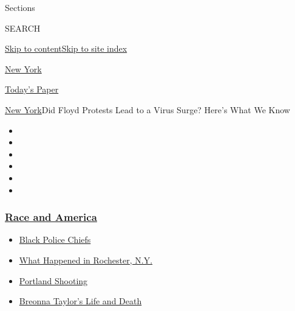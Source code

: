 Sections

SEARCH

\protect\hyperlink{site-content}{Skip to
content}\protect\hyperlink{site-index}{Skip to site index}

\href{https://www.nytimes3xbfgragh.onion/section/nyregion}{New York}

\href{https://myaccount.nytimes3xbfgragh.onion/auth/login?response_type=cookie\&client_id=vi}{}

\href{https://www.nytimes3xbfgragh.onion/section/todayspaper}{Today's
Paper}

\href{/section/nyregion}{New York}\textbar{}Did Floyd Protests Lead to a
Virus Surge? Here's What We Know

\begin{itemize}
\item
\item
\item
\item
\item
\item
\end{itemize}

\hypertarget{race-and-america}{%
\subsubsection{\texorpdfstring{\href{https://www.nytimes3xbfgragh.onion/news-event/george-floyd-protests-minneapolis-new-york-los-angeles?name=styln-george-floyd\&region=TOP_BANNER\&block=storyline_menu_recirc\&action=click\&pgtype=Article\&impression_id=555e01a0-f4ba-11ea-b9f9-d5e9868d2682\&variant=undefined}{Race
and America}}{Race and America}}\label{race-and-america}}

\begin{itemize}
\tightlist
\item
  \href{https://www.nytimes3xbfgragh.onion/2020/09/11/us/black-police-chiefs-reform.html?name=styln-george-floyd\&region=TOP_BANNER\&block=storyline_menu_recirc\&action=click\&pgtype=Article\&impression_id=555e01a1-f4ba-11ea-b9f9-d5e9868d2682\&variant=undefined}{Black
  Police Chiefs}
\item
  \href{https://www.nytimes3xbfgragh.onion/2020/09/04/nyregion/rochester-police-daniel-prude.html?name=styln-george-floyd\&region=TOP_BANNER\&block=storyline_menu_recirc\&action=click\&pgtype=Article\&impression_id=555e01a2-f4ba-11ea-b9f9-d5e9868d2682\&variant=undefined}{What
  Happened in Rochester, N.Y.}
\item
  \href{https://www.nytimes3xbfgragh.onion/2020/08/30/us/portland-shooting-explained.html?name=styln-george-floyd\&region=TOP_BANNER\&block=storyline_menu_recirc\&action=click\&pgtype=Article\&impression_id=555e01a3-f4ba-11ea-b9f9-d5e9868d2682\&variant=undefined}{Portland
  Shooting}
\item
  \href{https://www.nytimes3xbfgragh.onion/2020/08/30/us/breonna-taylor-police-killing.html?name=styln-george-floyd\&region=TOP_BANNER\&block=storyline_menu_recirc\&action=click\&pgtype=Article\&impression_id=555e01a4-f4ba-11ea-b9f9-d5e9868d2682\&variant=undefined}{Breonna
  Taylor's Life and Death}
\end{itemize}


